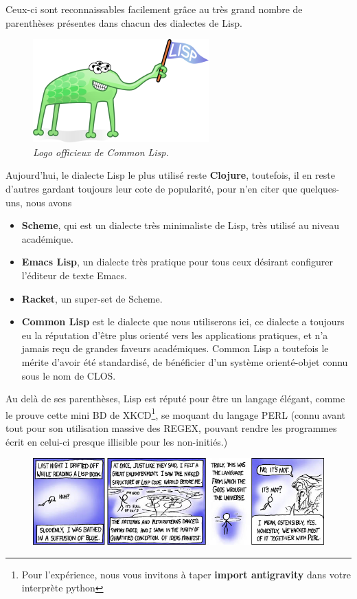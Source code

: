 \documentclass[a4paper, 12pt]{article}
\numberwithin{equation}{subsection}
\begin{document}
Ceux-ci sont reconnaissables facilement grâce au très grand nombre de parenthèses présentes dans chacun des dialectes de Lisp. \\
\begin{figure}
  \includegraphics[scale=0.5]{imgs/Lisplogo_alien_256.png}
  \caption{{\em Logo officieux de Common Lisp.}}
\end{figure}

Aujourd'hui, le dialecte Lisp le plus utilisé reste {\bf Clojure}, toutefois, il en reste d'autres gardant toujours leur cote de popularité, pour n'en citer que quelques-uns, nous avons

\begin{itemize}
  \item {\bf Scheme}, qui est un dialecte très minimaliste de Lisp, très utilisé au niveau académique.
  \item {\bf Emacs Lisp}, un dialecte très pratique pour tous ceux désirant configurer l'éditeur de texte Emacs.
  \item {\bf Racket}, un super-set de Scheme.
  \item {\bf Common Lisp} est le dialecte que nous utiliserons ici, ce dialecte a toujours eu la réputation d'être plus orienté vers les applications pratiques, et n'a jamais reçu de grandes faveurs académiques. Common Lisp a toutefois le mérite d'avoir été standardisé, de bénéficier d'un système orienté-objet connu sous le nom de CLOS.
\end{itemize}
Au delà de ses parenthèses, Lisp est réputé pour être un langage élégant, comme le prouve cette mini BD de XKCD\footnote{Pour l'expérience, nous vous invitons à taper {\bf import antigravity} dans votre interprète python}, se moquant du langage PERL (connu avant tout pour son utilisation massive des REGEX, pouvant rendre les programmes écrit en celui-ci presque illisible pour les non-initiés.)
\begin{figure}[H]
  \centering
  \includegraphics[scale=4]{imgs/lisp.jpeg}
\end{figure}
\end{document}

